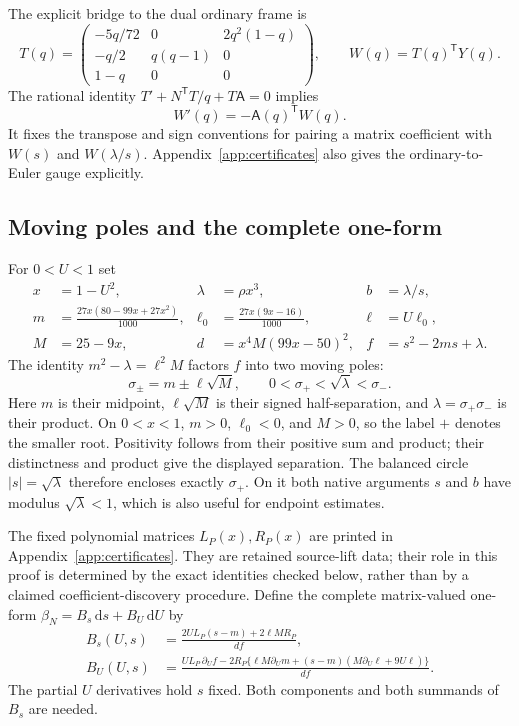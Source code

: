 \documentclass[11pt,a4paper]{article}
\newcommand{\dd}{\mathrm d}
\newcommand{\tr}{\mathsf T}
\begin{document}
The explicit bridge to the dual ordinary frame is
\begin{equation}\label{eq:dual-state}
 T(q)=\begin{pmatrix}
 -5q/72&0&2q^2(1-q)\\
 -q/2&q(q-1)&0\\1-q&0&0
 \end{pmatrix},\qquad W(q)=T(q)^{\tr}Y(q).
\end{equation}
The rational identity $T'+N^{\tr}T/q+T\mathsf A=0$ implies
\begin{equation}\label{eq:dual-ode}
 W'(q)=-\mathsf A(q)^{\tr}W(q).
\end{equation}
It fixes the transpose and sign conventions for pairing a matrix
coefficient with $W(s)$ and $W(\lambda/s)$. Appendix~\ref{app:certificates}
also gives the ordinary-to-Euler gauge explicitly.

\subsection{Moving poles and the complete one-form}
For $0<U<1$ set
\begin{equation}\label{eq:beta-parameters}
 \begin{aligned}
 x&=1-U^2,& \lambda&=\rho x^3,& b&=\lambda/s,\\
 m&=\frac{27x(80-99x+27x^2)}{1000},&
 \ell_0&=\frac{27x(9x-16)}{1000},& \ell&=U\ell_0,\\
 M&=25-9x,& d&=x^4M(99x-50)^2,& f&=s^2-2ms+\lambda.
 \end{aligned}
\end{equation}
The identity $m^2-\lambda=\ell^2M$ factors $f$ into two moving poles:
\begin{equation}\label{eq:roots}
 \sigma_\pm=m\pm\ell\sqrt M,\qquad
 0<\sigma_+<\sqrt\lambda<\sigma_-.
\end{equation}
Here $m$ is their midpoint, $\ell\sqrt M$ is their signed
half-separation, and $\lambda=\sigma_+\sigma_-$ is their product.
On $0<x<1$, $m>0$, $\ell_0<0$, and $M>0$, so the label $+$ denotes
the smaller root. Positivity follows from their positive sum and product;
their distinctness and product give the displayed separation.
The balanced circle $|s|=\sqrt\lambda$ therefore encloses exactly
$\sigma_+$. On it both native arguments $s$ and $b$ have modulus
$\sqrt\lambda<1$, which is also useful for endpoint estimates.

The fixed polynomial matrices $L_P(x),R_P(x)$ are printed in
Appendix~\ref{app:certificates}. They are retained source-lift data;
their role in this proof is determined by the exact identities checked
below, rather than by a claimed coefficient-discovery procedure.
Define the complete matrix-valued one-form
$\beta_N=B_s\,\dd s+B_U\,\dd U$ by
\begin{align}
 B_s(U,s)&=\frac{2U L_P(s-m)+2\ell M R_P}{df},\label{eq:beta-s}\\
 B_U(U,s)&=\frac{U L_P\,\partial_U f
 -2R_P\{\ell M\partial_Um+(s-m)(M\partial_U\ell+9U\ell)\}}{df}.
 \label{eq:beta-u}
\end{align}
The partial $U$ derivatives hold $s$ fixed. Both components and both
summands of $B_s$ are needed.
\end{document}
